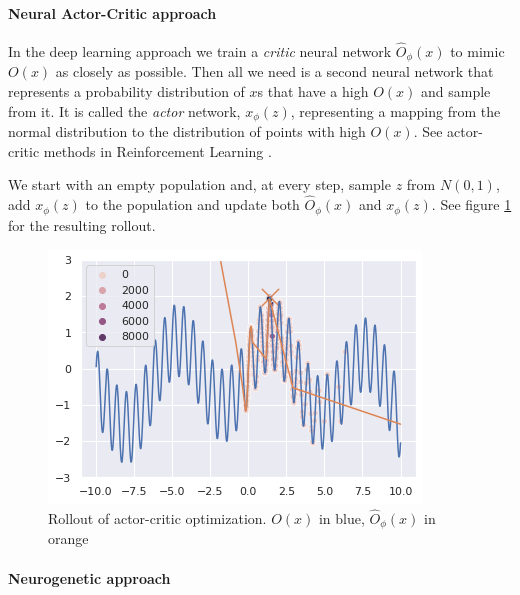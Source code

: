 \paragraph{Neural Actor-Critic approach}

In the deep learning approach we train a \emph{critic} neural network $ \hat{O}_{\phi}(x) $ to mimic $ O(x) $ as closely as possible. Then all we need is a second neural network that represents a probability distribution of $ x $s that have a high $ O(x) $ and sample from it. It is called the \emph{actor} network, $ x_{\phi}(z) $, representing a mapping from the normal distribution to the distribution of points with high $ O(x) $. See actor-critic methods in Reinforcement Learning \cite[section 13.5]{suttonReinforcementLearningSecond2018}.

We start with an empty population and, at every step, sample $ z $ from $ N(0,1) $, add $ x_{\phi}(z) $ to the population and update both $ \hat{O}_{\phi}(x) $ and $ x_{\phi}(z) $. See figure \ref{fig:neuropt-actor-critic} for the resulting rollout.
    
\begin{figure}
    \centering
    \includegraphics[width=0.8\linewidth]{images/neuropt3.png}
    \caption{Rollout of actor-critic optimization. $ O(x) $ in blue, $ \hat{O}_{\phi}(x) $ in orange}
    \label{fig:neuropt-actor-critic}
\end{figure}


\paragraph{Neurogenetic approach}

